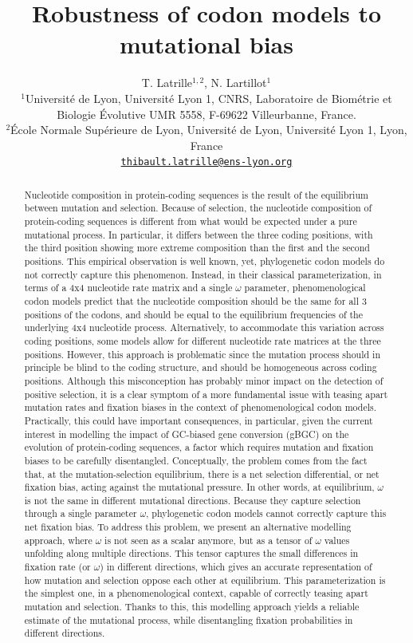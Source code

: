 \documentclass{article}
\title{Robustness of codon models to mutational bias}
\author{
 \large
 T. {Latrille}$^{1,2}$, N. {Lartillot}$^{1}$ \\
 \normalsize
	$^{1}$Université de Lyon, Université Lyon 1, CNRS, Laboratoire de Biométrie et Biologie Évolutive UMR 5558, F-69622 Villeurbanne, France.\\
	$^{2}$École Normale Supérieure de Lyon, Université de Lyon, Université Lyon 1, Lyon, France\\
	\texttt{\href{mailto:thibault.latrille@ens-lyon.org}{thibault.latrille@ens-lyon.org}} \\
}
\begin{document}
\maketitle

\begin{abstract}
 Nucleotide composition in protein-coding sequences is the result of the equilibrium between mutation and selection.
 Because of selection, the nucleotide composition of protein-coding sequences is different from what would be expected under a pure mutational process.
 In particular, it differs between the three coding positions, with the third position showing more extreme composition than the first and the second positions.
 This empirical observation is well known, yet, phylogenetic codon models do not correctly capture this phenomenon.
 Instead, in their classical parameterization, in terms of a 4x4 nucleotide rate matrix and a single $\omega$ parameter, phenomenological codon models predict that the nucleotide composition should be the same for all $3$ positions of the codons, and should be equal to the equilibrium frequencies of the underlying 4x4 nucleotide process.
 Alternatively, to accommodate this variation across coding positions, some models allow for different nucleotide rate matrices at the three positions.
 However, this approach is problematic since the mutation process should in principle be blind to the coding structure, and should be homogeneous across coding positions.
 Although this misconception has probably minor impact on the detection of positive selection, it is a clear symptom of a more fundamental issue with teasing apart mutation rates and fixation biases in the context of phenomenological codon models.
 Practically, this could have important consequences, in particular, given the current interest in modelling the impact of GC-biased gene conversion ({gBGC}) on the evolution of protein-coding sequences, a factor which requires mutation and fixation biases to be carefully disentangled.
 Conceptually, the problem comes from the fact that, at the mutation-selection equilibrium, there is a net selection differential, or net fixation bias, acting against the mutational pressure.
 In other words, at equilibrium, $\omega$ is not the same in different mutational directions.
 Because they capture selection through a single parameter $\omega$, phylogenetic codon models cannot correctly capture this net fixation bias.
 To address this problem, we present an alternative modelling approach, where $\omega$ is not seen as a scalar anymore, but as a tensor of $\omega$ values unfolding along multiple directions.
 This tensor captures the small differences in fixation rate (or $\omega$) in different directions, which gives an accurate representation of how mutation and selection oppose each other at equilibrium.
 This parameterization is the simplest one, in a phenomenological context, capable of correctly teasing apart mutation and selection.
 Thanks to this, this modelling approach yields a reliable estimate of the mutational process, while disentangling fixation probabilities in different directions.
\end{abstract}
\end{document}
